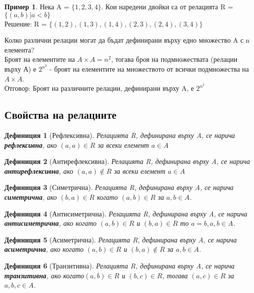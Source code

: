 \documentclass[fleqn, 12pt]{article}
\newtheorem{definition}{Дефиниция}[subsection]
\theoremstyle{definition}
\newtheorem{example}{Пример}[subsection]
\begin{document}
\begin{example}
Нека A = $\{1, 2, 3, 4\}$. Кои наредени двойки са от релацията R = $\{(a, b) | a < b\}$ \\
Решение: R =  $\{(1, 2), (1, 3), (1, 4), (2, 3), (2, 4), (3, 4) \}$
\end{example}
Колко различни релации могат да бъдат дефинирани върху едно множество A с n елемента? \\
Броят на елементите на $A \times A = n^2$, тогава броя на подмножествата (релации върху А) е $2^{n^2}$ - броят на елементите на множеството от всички подмножества на $A \times A$.\\
Отговор: Броят на различните релации, дефинирани върху A, е $2^{n^2}$

\subsection{Свойства на релациите}
 
\begin{definition}[Рефлексивна]
Релацията R, дефинирана върху A, се нарича \textbf{рефлексивна}, ако $(a, a) \in R $ за всеки елемент $a \in A$
\end{definition}

\begin{definition}[Антирефлексивна]
Релацията R, дефинирана върху A, се нарича \textbf{антирефлексивна}, ако $(a, a) \notin R $ за всеки елемент $a \in A$
\end{definition}

\begin{definition}[Симетрична]
Релацията R, дефинирана върху A, се нарича \textbf{симетрична}, ако $(b, a) \in R$ когато $(a, b) \in R $ за $a, b \in A$. 
\end{definition}

\begin{definition}[Антисиметрична]
Релацията R, дефинирана върху A, се нарича \textbf{антисиметрична}, ако когато $(a, b) \in R $ и $(b, a) \in R$ то $a = b, a,b \in A$. 
\end{definition}

\begin{definition}[Асиметрична]
Релацията R, дефинирана върху A, се нарича \textbf{асиметрична}, ако когато $(a, b) \in R $ и $(b, a) \notin R$ за $a,b \in A$. 
\end{definition}

\begin{definition}[Транзитивна]
Релацията R, дефинирана върху A, се нарича \textbf{транзитивна}, ако когато$(a, b)\in R$ и $(b,c) \in R$, тогава $(a, c)\in R$ за $a, b, c \in A$. 
\end{definition}
\end{document}

